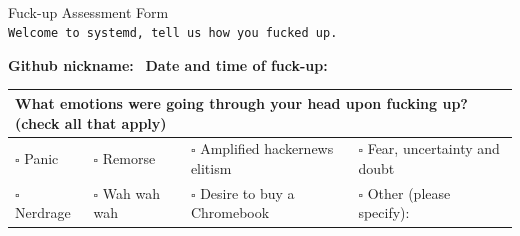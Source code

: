 \documentclass[letterpaper]{article}
\begin{document}
\vspace*{1.5em}

\begin{center}
\\[0.75em]
{\LARGE Fuck-up Assessment Form}\\[1.5em]
\texttt{Welcome to systemd, tell us how you fucked up.}
\end{center}

\vspace{1em}
\textbf{Github nickname:} \dotfill
\ \textbf{Date and time of fuck-up:} \dotfill
\vspace{0.5em}

\def\arraystretch{1.5}  %
\begin{tabularx}{\textwidth}{|lllX|}
\hline
\multicolumn{4}{|l|}{\textbf{What emotions were going through your head upon fucking up?} (check all that apply)} \\ \hline
\(\square\) Panic &
\(\square\) Remorse &
\(\square\) Amplified hackernews elitism &
\(\square\) Fear, uncertainty and doubt \\

\(\square\) Nerdrage &
\(\square\) Wah wah wah &
\(\square\) Desire to buy a Chromebook &
\(\square\) Other (please specify): \dotfill \\ \hline
\end{tabularx}

\vspace{0.5em}

\newlength{\listenedwidth}
\newlength{\didntlistenwidth}
\settowidth{\listenedwidth}{I listened to}
\settowidth{\didntlistenwidth}{I didn't listen to}
\end{document}
